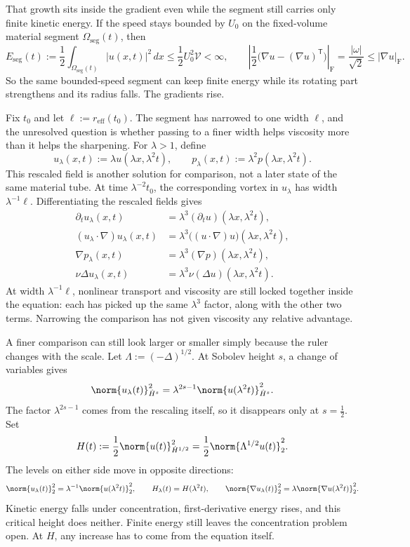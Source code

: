 That growth sits inside the gradient even while the segment still carries only finite kinetic energy. If the speed stays bounded by \(U_0\) on the fixed-volume material segment \(\Omega_{\mathrm{seg}}(t)\), then
\[
  E_{\mathrm{seg}}(t)
  :=
  \frac12\int_{\Omega_{\mathrm{seg}}(t)}|u(x,t)|^2\,dx
  \leq
  \frac12U_0^2\mathcal V
  <
  \infty,
  \qquad
  \left|\frac12\bigl(\nabla u-(\nabla u)^{\mathsf T}\bigr)\right|_{\mathrm F}
  =
  \frac{|\omega|}{\sqrt2}
  \leq
  |\nabla u|_{\mathrm F}.
\]
So the same bounded-speed segment can keep finite energy while its rotating part strengthens and its radius falls. The gradients rise.

Fix \(t_0\) and let \(\ell:=r_{\mathrm{eff}}(t_0)\). The segment has narrowed to one width \(\ell\), and the unresolved question is whether passing to a finer width helps viscosity more than it helps the sharpening. For \(\lambda>1\), define
\[
  u_\lambda(x,t)
  :=
  \lambda u(\lambda x,\lambda^2t),
  \qquad
  p_\lambda(x,t)
  :=
  \lambda^2p(\lambda x,\lambda^2t).
\]
This rescaled field is another solution for comparison, not a later state of the same material tube. At time \(\lambda^{-2}t_0\), the corresponding vortex in \(u_\lambda\) has width \(\lambda^{-1}\ell\). Differentiating the rescaled fields gives
\[
\begin{aligned}
  \partial_tu_\lambda(x,t)
  &=
  \lambda^3(\partial_tu)(\lambda x,\lambda^2t),
  \\
  (u_\lambda\cdot\nabla)u_\lambda(x,t)
  &=
  \lambda^3\bigl((u\cdot\nabla)u\bigr)(\lambda x,\lambda^2t),
  \\
  \nabla p_\lambda(x,t)
  &=
  \lambda^3(\nabla p)(\lambda x,\lambda^2t),
  \\
  \nu\Delta u_\lambda(x,t)
  &=
  \lambda^3\nu(\Delta u)(\lambda x,\lambda^2t).
\end{aligned}
\]
At width \(\lambda^{-1}\ell\), nonlinear transport and viscosity are still locked together inside the equation: each has picked up the same \(\lambda^3\) factor, along with the other two terms. Narrowing the comparison has not given viscosity any relative advantage.

A finer comparison can still look larger or smaller simply because the ruler changes with the scale. Let \(\Lambda:=(-\Delta)^{1/2}\). At Sobolev height \(s\), a change of variables gives
\[
  \norm{u_\lambda(t)}_{\dot H^s}^2
  =
  \lambda^{2s-1}
  \norm{u(\lambda^2t)}_{\dot H^s}^2.
\]
The factor \(\lambda^{2s-1}\) comes from the rescaling itself, so it disappears only at \(s=\tfrac12\). Set
\[
  H(t)
  :=
  \frac12\norm{u(t)}_{\dot H^{1/2}}^2
  =
  \frac12\norm{\Lambda^{1/2}u(t)}_2^2.
\]
The levels on either side move in opposite directions:
\[
  \norm{u_\lambda(t)}_2^2
  =
  \lambda^{-1}\norm{u(\lambda^2t)}_2^2,
  \qquad
  H_\lambda(t)=H(\lambda^2t),
  \qquad
  \norm{\nabla u_\lambda(t)}_2^2
  =
  \lambda\norm{\nabla u(\lambda^2t)}_2^2.
\]
Kinetic energy falls under concentration, first-derivative energy rises, and this critical height does neither. Finite energy still leaves the concentration problem open. At \(H\), any increase has to come from the equation itself.

